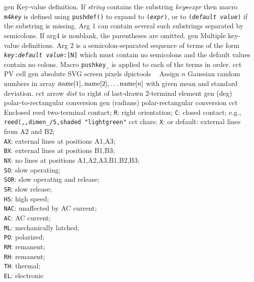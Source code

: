 %
  {gen}%
  {Key-value definition.
  If {\sl string} contains the substring
  {\sl key}{\tt =}{\sl expr} then macro {\tt m4{\sl key}}%
  is defined using {\tt pushdef()} to
  expand to {\tt ({\sl expr})}, or to {\tt ({\sl default value})} if the
  substring is missing.  Arg 1 can contain several such substrings separated
  by semicolons.
  If arg4 is nonblank, the parentheses are omitted.
   }%
%
  {gen}%
  {Multiple key-value definitions. Arg 2 is a semicolon-separated
   sequence of terms of the form {\tt {\sl key}:{\sl default value}:[N]}%
   which must contain no semicolons and the default values contain no colons.
   Macro {\tt pushkey\_} is applied to each of the terms in order.
   }%
%
  {cct}%
  {PV cell}%
%
  {gen}%
  {absolute SVG screen pixels}%
%
%
%
  {dpictools}%
  {$\;\;$ Assign $n$ Gaussian random numbers in array
   $\hbox{\sl name}[1], \hbox{\sl name}[2], \ldots \hbox{\sl name}[n]$
   with given mean and standard deviation.}%
%
  {cct}%
  {arrow {\sl dist} to right of last-drawn 2-terminal element
   }%
%
  {gen}%
  {(deg) polar-to-rectangular conversion}%
%
  {gen}%
  {(radians) polar-rectangular conversion}%
%
  {cct}%
  {Enclosed reed two-terminal contact;
   {\tt R}: right orientation; {\tt C}: closed contact; e.g., {\tt
   reed(,{,}dimen\_/5,shaded "lightgreen"} }%
%
  {cct}%
  {chars:
    {\tt X}: or default: external lines from A2 and B2;\\
    {\tt AX}: external lines at positions A1,A3;\\
    {\tt BX}: external lines at positions B1,B3;\\
    {\tt NX}: no lines at positions A1,A2,A3,B1,B2,B3;\\
    {\tt SO}: slow operating;\\
    {\tt SOR}: slow operating and release;\\
    {\tt SR}: slow release;\\
    {\tt HS}: high speed;\\
    {\tt NAC}: unaffected by AC current;\\
    {\tt AC}: AC current;\\
    {\tt ML}: mechanically latched;\\
    {\tt PO}: polarized;\\
    {\tt RM}: remanent;\\
    {\tt RH}: remanent;\\
    {\tt TH}: thermal;\\
    {\tt EL}: electronic
   }%

